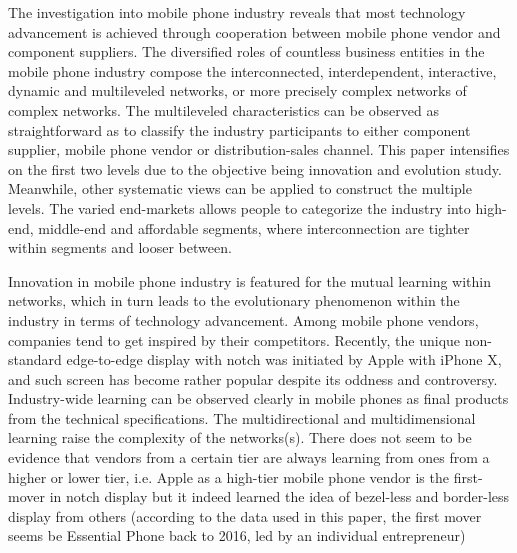 \documentclass[utf8,english]{gradu3}
\begin{document}
The investigation into mobile phone industry reveals that most technology advancement is achieved through cooperation between mobile phone vendor and component suppliers. The diversified roles of countless business entities in the mobile phone industry compose the interconnected, interdependent, interactive, dynamic and multileveled networks, or more precisely complex networks of complex networks. The multileveled characteristics can be observed as straightforward as to classify the industry participants to either component supplier, mobile phone vendor or distribution-sales channel. This paper intensifies on the first two levels due to the objective being innovation and evolution study. Meanwhile, other systematic views can be applied to construct the multiple levels. The varied end-markets allows people to categorize the industry into high-end, middle-end and affordable segments, where interconnection are tighter within segments and looser between.

Innovation in mobile phone industry is featured for the mutual learning within networks, which in turn leads to the evolutionary phenomenon within the industry in terms of technology advancement. Among mobile phone vendors, companies tend to get inspired by their competitors. Recently, the unique non-standard edge-to-edge display with notch was initiated by Apple with iPhone X, and such screen has become rather popular despite its oddness and controversy. Industry-wide learning can be observed clearly in mobile phones as final products from the technical specifications. The multidirectional and multidimensional learning raise the complexity of the networks(s). There does not seem to be evidence that vendors from a certain tier are always learning from ones from a higher or lower tier, i.e. Apple as a high-tier mobile phone vendor is the first-mover in notch display but it indeed learned the idea of bezel-less and border-less display from others (according to the data used in this paper, the first mover seems be Essential Phone back to 2016, led by an individual entrepreneur)
\end{document}
